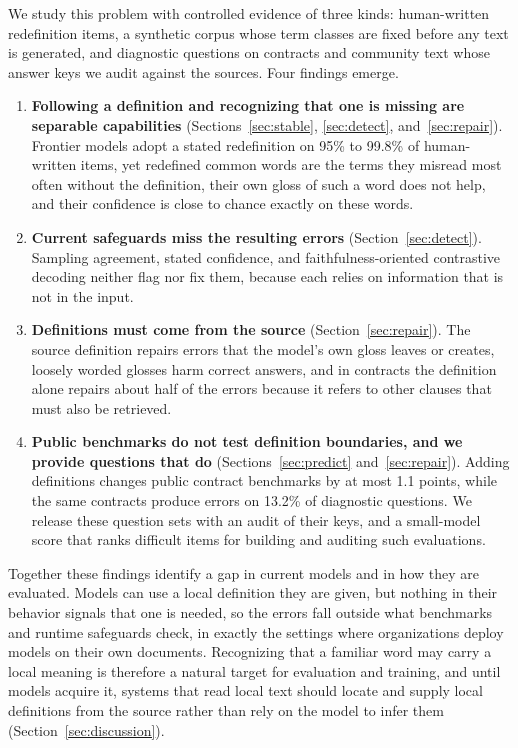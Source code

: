 We study this problem with controlled evidence of three kinds: human-written redefinition items, a synthetic corpus whose term classes are fixed before any text is generated, and diagnostic questions on contracts and community text whose answer keys we audit against the sources. Four findings emerge.

\begin{enumerate}
\item \textbf{Following a definition and recognizing that one is missing are separable capabilities} (Sections~\ref{sec:stable}, \ref{sec:detect}, and~\ref{sec:repair}). Frontier models adopt a stated redefinition on 95\% to 99.8\% of human-written items, yet redefined common words are the terms they misread most often without the definition, their own gloss of such a word does not help, and their confidence is close to chance exactly on these words.
\item \textbf{Current safeguards miss the resulting errors} (Section~\ref{sec:detect}). Sampling agreement, stated confidence, and faithfulness-oriented contrastive decoding neither flag nor fix them, because each relies on information that is not in the input.
\item \textbf{Definitions must come from the source} (Section~\ref{sec:repair}). The source definition repairs errors that the model's own gloss leaves or creates, loosely worded glosses harm correct answers, and in contracts the definition alone repairs about half of the errors because it refers to other clauses that must also be retrieved.
\item \textbf{Public benchmarks do not test definition boundaries, and we provide questions that do} (Sections~\ref{sec:predict} and~\ref{sec:repair}). Adding definitions changes public contract benchmarks by at most 1.1 points, while the same contracts produce errors on 13.2\% of diagnostic questions. We release these question sets with an audit of their keys, and a small-model score that ranks difficult items for building and auditing such evaluations.
\end{enumerate}

Together these findings identify a gap in current models and in how they are evaluated. Models can use a local definition they are given, but nothing in their behavior signals that one is needed, so the errors fall outside what benchmarks and runtime safeguards check, in exactly the settings where organizations deploy models on their own documents. Recognizing that a familiar word may carry a local meaning is therefore a natural target for evaluation and training, and until models acquire it, systems that read local text should locate and supply local definitions from the source rather than rely on the model to infer them (Section~\ref{sec:discussion}).
